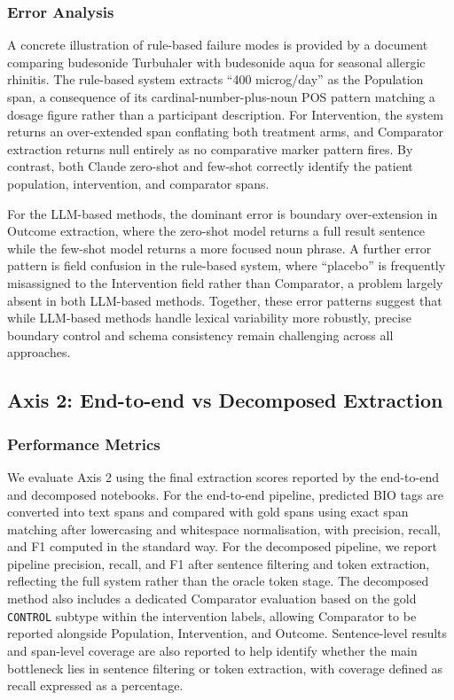 \documentclass{article}
\begin{document}
\subsubsection{Error Analysis}

A concrete illustration of rule-based failure modes is provided by a document comparing budesonide Turbuhaler with budesonide aqua for seasonal allergic rhinitis. The rule-based system extracts ``400 microg/day'' as the Population span, a consequence of its cardinal-number-plus-noun POS pattern matching a dosage figure rather than a participant description. For Intervention, the system returns an over-extended span conflating both treatment arms, and Comparator extraction returns null entirely as no comparative marker pattern fires. By contrast, both Claude zero-shot and few-shot correctly identify the patient population, intervention, and comparator spans.

For the LLM-based methods, the dominant error is boundary over-extension in Outcome extraction, where the zero-shot model returns a full result sentence while the few-shot model returns a more focused noun phrase. A further error pattern is field confusion in the rule-based system, where ``placebo'' is frequently misassigned to the Intervention field rather than Comparator, a problem largely absent in both LLM-based methods. Together, these error patterns suggest that while LLM-based methods handle lexical variability more robustly, precise boundary control and schema consistency remain challenging across all approaches.


\subsection{Axis 2: End-to-end vs Decomposed Extraction}

\subsubsection{Performance Metrics}

We evaluate Axis 2 using the final extraction scores reported by the end-to-end and decomposed notebooks. For the end-to-end pipeline, predicted BIO tags are converted into text spans and compared with gold spans using exact span matching after lowercasing and whitespace normalisation, with precision, recall, and F1 computed in the standard way. For the decomposed pipeline, we report pipeline precision, recall, and F1 after sentence filtering and token extraction, reflecting the full system rather than the oracle token stage. The decomposed method also includes a dedicated Comparator evaluation based on the gold \texttt{CONTROL} subtype within the intervention labels, allowing Comparator to be reported alongside Population, Intervention, and Outcome. Sentence-level results and span-level coverage are also reported to help identify whether the main bottleneck lies in sentence filtering or token extraction, with coverage defined as recall expressed as a percentage.
\end{document}
